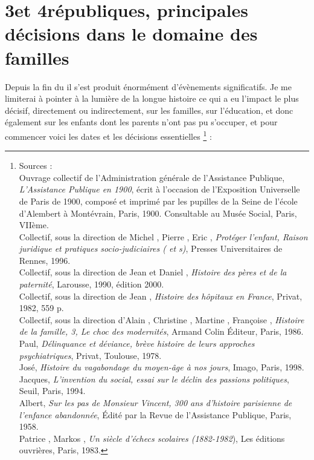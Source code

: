 
\chapter{3\eme et 4\eme républiques, principales décisions dans le domaine des familles}


 Depuis la fin du  il s'est produit énormément d'évènements significatifs. Je me limiterai à pointer à la lumière de la longue histoire ce qui a eu l'impact le plus décisif, directement ou indirectement, sur les familles, sur l'éducation, et donc également sur les enfants dont les parents n'ont pas pu s'occuper, et pour commencer voici les dates et les décisions essentielles%
\footnote{Sources :
\\Ouvrage collectif de l'Administration générale de l'Assistance Publique, \emph{L'Assistance Publique en 1900}, écrit à l'occasion de l'Exposition Universelle de Paris de 1900, composé et imprimé par les pupilles de la Seine de l'école d'Alembert à Montévrain, Paris, 1900. Consultable au Musée Social, Paris, VIIème.
\\Collectif, sous la direction de Michel , Pierre , Eric , \emph{Protéger l'enfant, Raison juridique et pratiques socio-judiciaires ( et s)}, Presses Universitaires de Rennes, 1996.
\\Collectif, sous la direction de Jean  et Daniel , \emph{Histoire des pères et de la paternité}, Larousse, 1990, édition 2000.
\\Collectif, sous la direction de Jean , \emph{Histoire des hôpitaux en France}, Privat, 1982, 559 p.
\\Collectif, sous la direction d'Alain , Christine , Martine , Françoise , \emph{Histoire de la famille, 3, Le choc des modernités}, Armand Colin Éditeur, Paris, 1986.
\\ Paul, \emph{Délinquance et déviance, brève histoire de leurs approches psychiatriques}, Privat, Toulouse, 1978.
\\ José, \emph{Histoire du vagabondage du moyen-âge à nos jours}, Imago, Paris, 1998.
\\ Jacques, \emph{L'invention du social, essai sur le déclin des passions politiques}, Seuil, Paris, 1994.
\\ Albert, \emph{Sur les pas de Monsieur Vincent, 300 ans d'histoire parisienne de l'enfance abandonnée}, Édité par la Revue de l'Assistance Publique, Paris, 1958.
\\Patrice {}, Markos , \emph{Un siècle d'échecs scolaires (1882-1982}), Les éditions ouvrières, Paris, 1983.}%
 :

